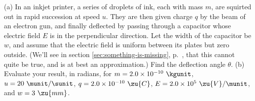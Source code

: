 (a) In an inkjet printer, a series of droplets of ink, each with mass $m$, are squirted out in rapid succession
at speed $u$. They are then given charge $q$ by the beam of an electron gun, and
finally deflected by passing through a capacitor whose electric field $E$
is in the perpendicular direction. Let the width of the capacitor be $w$, and assume that
the electric field is uniform between its plates but zero outside. (We'll see in
section \ref{sec:something-is-missing}, p.~\pageref{sec:something-is-missing}, that this
cannot quite be true, and is at best an approximation.) Find the deflection angle $\theta$.\answercheck\hwendpart
%
(b) Evaluate your result, in radians, for $m=2.0\times10^{-10}\ \kgunit$, $u=20\ \munit/\sunit$, $q=2.0\times10^{-10}\ \zu{C}$, 
$E=2.0\times10^5\ \zu{V}/\munit$, and $w=3\ \zu{mm}$.\answercheck\hwendpart

